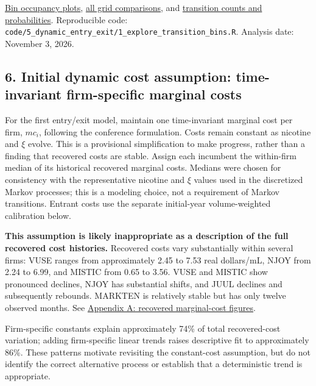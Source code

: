 \documentclass[10pt,]{article}
\begin{document}
\href{../../output/dynamic_entry_exit/transition_bins_2026-11-03/joint_state_occupancy.pdf}{Bin
occupancy plots},
\href{../../output/dynamic_entry_exit/transition_bins_2026-11-03/grid_summary.csv}{all
grid comparisons}, and
\href{../../output/dynamic_entry_exit/transition_bins_2026-11-03/transition_counts_probabilities.csv}{transition
counts and probabilities}. Reproducible code:
\texttt{code/5\_dynamic\_entry\_exit/1\_explore\_transition\_bins.R}.
Analysis date: November 3, 2026.

\hypertarget{initial-dynamic-cost-assumption-time-invariant-firm-specific-marginal-costs}{\subsection{6.
Initial dynamic cost assumption: time-invariant firm-specific marginal
costs}\label{initial-dynamic-cost-assumption-time-invariant-firm-specific-marginal-costs}}

For the first entry/exit model, maintain one time-invariant marginal
cost per firm, \(mc_i\), following the conference formulation. Costs
remain constant as nicotine and \(\xi\) evolve. This is a provisional
simplification to make progress, rather than a finding that recovered
costs are stable. Assign each incumbent the within-firm median of its
historical recovered marginal costs. Medians were chosen for consistency
with the representative nicotine and \(\xi\) values used in the
discretized Markov processes; this is a modeling choice, not a
requirement of Markov transitions. Entrant costs use the separate
initial-year volume-weighted calibration below.

\textbf{This assumption is likely inappropriate as a description of the
full recovered cost histories.} Recovered costs vary substantially
within several firms: VUSE ranges from approximately 2.45 to 7.53 real
dollars/mL, NJOY from 2.24 to 6.99, and MISTIC from 0.65 to 3.56. VUSE
and MISTIC show pronounced declines, NJOY has substantial shifts, and
JUUL declines and subsequently rebounds. MARKTEN is relatively stable
but has only twelve observed months. See
\protect\hyperlink{appendix-a-recovered-marginal-cost-figures}{Appendix
A: recovered marginal-cost figures}.

Firm-specific constants explain approximately 74\% of total
recovered-cost variation; adding firm-specific linear trends raises
descriptive fit to approximately 86\%. These patterns motivate
revisiting the constant-cost assumption, but do not identify the correct
alternative process or establish that a deterministic trend is
appropriate.
\end{document}
